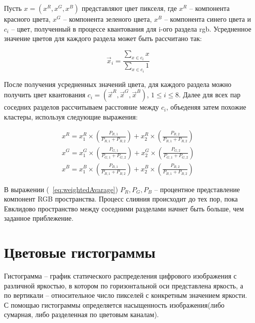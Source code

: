 Пусть $x = (x^R, x^G, x^B)$ представляют цвет пикселя, где $x^R$ -- компонента красного цвета, $x^G$ -- компонента зеленого цвета, $x^B$ -- компонента синего цвета и $c_i$ -- цвет, полученный в процессе квантования для i-ого раздела rgb. Усредненное значение цветов для каждого раздела может быть рассчитано так: 

\begin{equation}
	\vec{x}_i = \frac{\sum_{x \in c_i}x}{\sum_{x \in c_i}1}
\end{equation}

После получения усредненных значений цвета, для каждого раздела можно получить цвет квантования $c_i = (\vec{x}^R, \vec{x}^G, \vec{x}^B)$, $1 \leq i \leq 8$. Далее для всех пар соседних разделов рассчитываем расстояние между $c_i$, объеденяя затем похожие кластеры, используя следующие выражения:

\begin{equation}
\begin{align*}
	x^R = x^R_1 \times (\frac{P_{R,1}}{P_{R,1} + P_{R,2}}) + x^R_2 \times (\frac{P_{R,2}}{P_{R,1} + P_{R,2}}) \\
	x^G = x^G_1 \times (\frac{P_{G,1}}{P_{G,1} + P_{G,2}}) + x^G_2 \times (\frac{P_{G,2}}{P_{G,1} + P_{G,2}}) \\ 
	x^B = x^B_1 \times (\frac{P_{B,1}}{P_{B,1} + P_{B,2}}) + x^B_2 \times (\frac{P_{B,2}}{P_{B,1} + P_{B,2}})
\end{align*}
\label{eq:weightedAvarage}
\end{equation}

В выражении (~\ref{eq:weightedAvarage}) $P_R, P_G, P_B$ -- процентное представление компонент RGB пространства. Процесс слияния происходит до тех пор, пока Евклидово пространство между соседними разделами начнет быть больше, чем заданное приблежение.

\section{ Цветовые гистограммы}
Гистограмма -- график статического распределения цифрового изображения с различной яркостью, в котором по горизонтальной оси представлена яркость, а по вертикали -- относительное число пикселей с конкретным значением яркости. С помощью гистограммы определяется насыщенность изображения(либо сумарная, либо разделенная по цветовым каналам).

\begin{figure}[ht!]
\end{figure}

